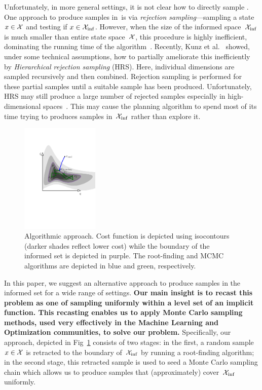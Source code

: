 \documentclass[letterpaper, 10 pt, conference]{ieeeconf}  %
\begin{document}
Unfortunately, in more general settings,
it is not clear how to directly sample \Cinf.
%
One approach to produce samples in~\Cinf is via \emph{rejection sampling}---sampling a state $x \in \mathcal{X}$ and testing if $x \in \mathcal{X}_{\rm {inf}}$.
However, when the size of the informed space~$\mathcal{X}_{\rm {inf}}$ is much smaller than entire state space~$\mathcal{X}$, this procedure is highly inefficient, dominating the running time of the algorithm~\cite{KTC16}.
Recently, Kunz et al.~\cite{KTC16} showed, under some technical assumptions, how to partially ameliorate this inefficiently by \emph{Hierarchical rejection sampling} (HRS). 
Here, individual dimensions are sampled recursively 
and then combined. Rejection sampling is performed for these partial samples until a suitable sample has been produced. 
Unfortunately, HRS may still produce a large number of rejected samples especially in high-dimensional spaces~\cite{KTC16}.
This may cause the planning algorithm to spend most of its time trying to produces samples in~$\mathcal{X}_{\rm {inf}}$ rather than explore it.

\begin{figure}[tb]
  \centering
  	\includegraphics[trim={4.5cm 0 4cm 2cm},clip,height = 5.25cm ]{fig/alg.pdf}
  \caption{
    \captionstyle
  	Algorithmic approach.
  	Cost function is depicted using isocontours (darker shades reflect lower cost) while the boundary of the informed set is depicted in purple. 
  	The root-finding and MCMC algorithms are depicted in blue and green, respectively.
  	}
   	\label{fig:alg}
\end{figure}



In this paper, we suggest an alternative approach to produce samples in the informed set \Cinf for a wide range of settings.
\textbf{
Our main insight is to recast this problem as one of sampling uniformly within a level set of an implicit function.
This recasting enables us to apply Monte Carlo sampling methods, used very effectively in the Machine Learning and Optimization communities, to solve our problem.
}
Specifically, our approach, depicted in Fig~\ref{fig:alg} consists of two stages:
in the first, a random sample $x \in \mathcal{X}$ is retracted to the boundary of~$\mathcal{X}_{\rm {inf}}$ by running a root-finding algorithm;
in the second stage, this retracted sample  is used to seed a Monte Carlo sampling chain which allows us to  produce samples that (approximately) cover~$\mathcal{X}_{\rm {inf}}$  uniformly.
\end{document}
